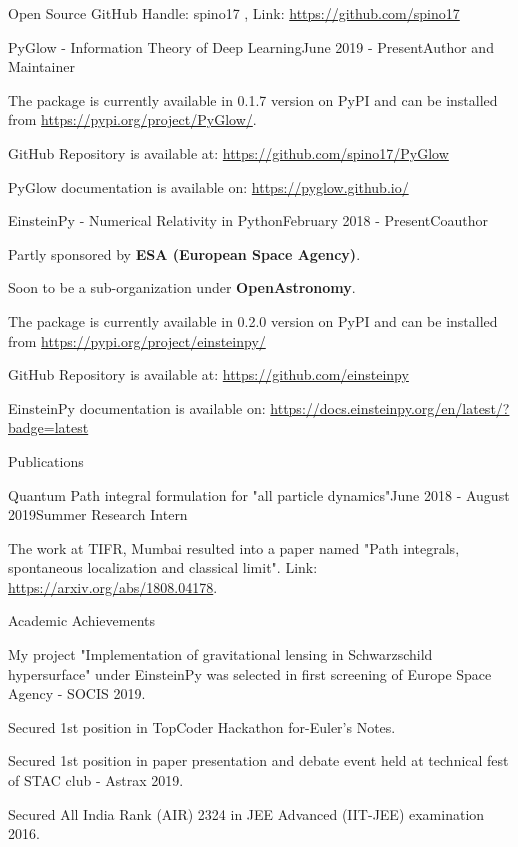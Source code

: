 \documentclass{resume} %
\begin{document}
\begin{rSection}{Open Source}
GitHub Handle: spino17 , Link: \url{https://github.com/spino17} \\
\begin{rSubsection}{PyGlow - Information Theory of Deep Learning}{June 2019 - Present}{Author and Maintainer}{}
\item The package is currently available in 0.1.7 version on PyPI and can be installed from \url{https://pypi.org/project/PyGlow/}.
\item GitHub Repository is available at: \url{https://github.com/spino17/PyGlow}
\item PyGlow documentation is available on: \url{https://pyglow.github.io/}
\end{rSubsection}
\begin{rSubsection}{EinsteinPy - Numerical Relativity in Python}{February 2018 - Present}{Coauthor}{}
\item Partly sponsored by \textbf{ESA (European Space Agency)}.
\item Soon to be a sub-organization under \textbf{OpenAstronomy}.
\item The package is currently available in 0.2.0 version on PyPI and can be installed from  \url{https://pypi.org/project/einsteinpy/}
\item GitHub Repository is available at:
\url{https://github.com/einsteinpy}
\item EinsteinPy documentation is available on:
\url{https://docs.einsteinpy.org/en/latest/?badge=latest}
\end{rSubsection}

\end{rSection}

\begin{rSection}{Publications}

\begin{rSubsection}{Quantum Path integral formulation for "all particle dynamics"}{June 2018 - August 2019}{Summer Research Intern}{}
\item The work at TIFR, Mumbai resulted into a paper named "Path integrals, spontaneous localization and classical limit". Link: \url{https://arxiv.org/abs/1808.04178}.
\end{rSubsection}

\end{rSection}

\begin{rSection}{Academic Achievements}
\item My project "Implementation of gravitational lensing in Schwarzschild hypersurface" under EinsteinPy was selected in first screening of Europe Space Agency - SOCIS 2019.
\item Secured 1st position in TopCoder Hackathon for-Euler’s Notes.
\item Secured 1st position in paper presentation and debate event held at technical fest of STAC club - Astrax 2019.
\item Secured All India Rank (AIR) 2324 in JEE Advanced (IIT-JEE) examination 2016.  
\end{rSection}
\end{document}
